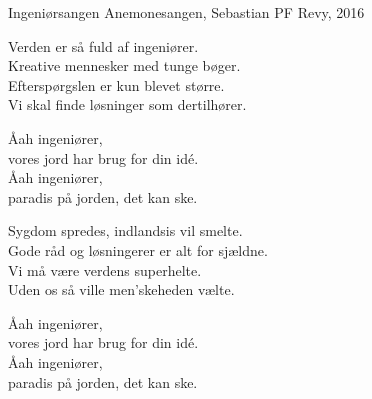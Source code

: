 \begin{song}{Ingeniørsangen}
  {} %
  {Anemonesangen, Sebastian} %
  {} %
  {PF Revy, 2016} %
  {\NotCCLIed} %

  \begin{SBVerse}
    Verden er så fuld af ingeniører.\\
    Kreative mennesker med tunge bøger.\\
    Efterspørgslen er kun blevet større.\\
    Vi skal finde løsninger som dertilhører.
  \end{SBVerse}

  \begin{SBChorus}
    Åah ingeniører,\\
    vores jord har brug for din idé.\\
    Åah ingeniører,\\
    paradis på jorden, det kan ske.
  \end{SBChorus}

  \begin{SBVerse}
    Sygdom spredes, indlandsis vil smelte.\\
    Gode råd og løsningerer er alt for sjældne.\\
    Vi må være verdens superhelte.\\
    Uden os så ville men'skeheden vælte.
  \end{SBVerse}

  \begin{SBChorus}
    Åah ingeniører,\\
    vores jord har brug for din idé.\\
    Åah ingeniører,\\
    paradis på jorden, det kan ske.
  \end{SBChorus}

  \begin{SBSection*}
  \end{SBSection*}
\end{song}